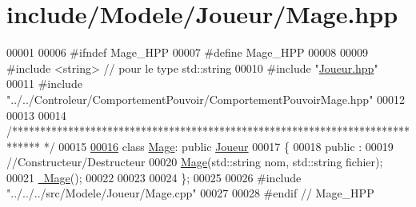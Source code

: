 \hypertarget{_mage_8hpp_source}{\section{include/\-Modele/\-Joueur/\-Mage.hpp}
}

\begin{DoxyCode}
00001 
00006 \textcolor{preprocessor}{#ifndef Mage\_HPP}
00007 \textcolor{preprocessor}{}\textcolor{preprocessor}{#define Mage\_HPP}
00008 \textcolor{preprocessor}{}
00009 \textcolor{preprocessor}{#include <string>} \textcolor{comment}{// pour le type std::string}
00010 \textcolor{preprocessor}{#include "\hyperlink{_joueur_8hpp}{Joueur.hpp}"}
00011 \textcolor{preprocessor}{#include "../../Controleur/ComportementPouvoir/ComportementPouvoirMage.hpp"}
00012 
00013 
00014 \textcolor{comment}{/*****************************************************************************
      */}
00015 
\hypertarget{_mage_8hpp_source_l00016}{}\hyperlink{class_mage}{00016} \textcolor{keyword}{class }\hyperlink{class_mage}{Mage}: \textcolor{keyword}{public} \hyperlink{class_joueur}{Joueur}
00017 \{   
00018    \textcolor{keyword}{public} :
00019       \textcolor{comment}{//Constructeur/Destructeur}
00020       \hyperlink{class_mage_afd12913f92aeb59dceb83ad1d6753ae9}{Mage}(std::string nom, std::string fichier);
00021       \hyperlink{class_mage_a0a3f693b67379cde4fcf2fa1622211ca}{~Mage}();
00022    
00023   
00024 \};
00025 
00026 \textcolor{preprocessor}{#include "../../../src/Modele/Joueur/Mage.cpp"}
00027 
00028 \textcolor{preprocessor}{#endif // Mage\_HPP}
\end{DoxyCode}
